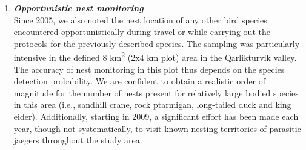 \documentclass[a4paper,twoside,12pt]{article}
\begin{document}
\begin{enumerate}[label=\roman*]
	\item[] \textit{\textbf{Opportunistic nest monitoring}}\\
	Since 2005, we also noted the nest location of any other bird species encountered opportunistically during travel or while carrying out the protocols for the previously described species. The sampling was particularly intensive in the defined 8 km\textsuperscript{2} (2x4 km plot) area in the Qarlikturvik valley. The accuracy of nest monitoring in this plot thus depends on the species detection probability. We are confident to obtain a realistic order of magnitude for the number of nests present for relatively large bodied species in this area (i.e., sandhill crane, rock ptarmigan, long-tailed duck and king eider). Additionally, starting in 2009, a significant effort has been made each year, though not systematically, to visit known nesting territories of parasitic jaegers throughout the study area.
	\end{enumerate}


\newpage
\end{document}
